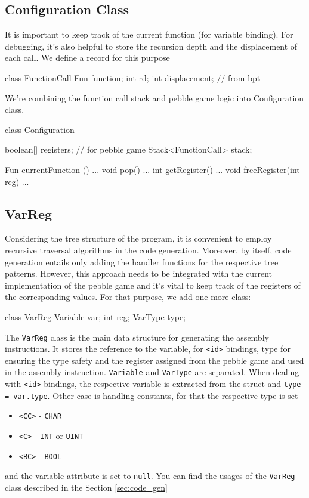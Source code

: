 \subsection{Configuration Class}
It is important to keep track of the current function (for variable binding). For debugging, it's also helpful to
store the recursion depth and the displacement of each call. We define a record for this purpose
\begin{codeblock}
class FunctionCall {
    Fun function;
    int rd;
    int displacement; // from bpt
}
\end{codeblock}
We're combining the function call stack and pebble game logic into Configuration class.
\begin{codeblock}
class Configuration {
    boolean[] registers; // for pebble game
    Stack<FunctionCall> stack;

    Fun currentFunction () { ... }
    void pop() { ... }
    int getRegister() { ... }
    void freeRegister(int reg) { ... }
}
\end{codeblock}

\subsection{VarReg}
Considering the tree structure of the program, it is convenient to employ recursive traversal algorithms in the code generation.
Moreover, by itself, code generation entails only adding the handler functions for the respective tree patterns. However, this
approach needs to be integrated with the current implementation of the pebble game and it's vital
to keep track of the registers of the corresponding values. For that purpose, we add one more class:
\begin{codeblock}
class VarReg {
    Variable var;
    int reg;
    VarType type;
}
\end{codeblock}
The \verb+VarReg+ class is the main data structure for generating the assembly instructions.
It stores the reference to the variable, for \verb+<id>+ bindings, type for ensuring the type safety and the register
assigned from the pebble game and used in the assembly instruction.
\verb+Variable+ and \verb+VarType+ are separated. When dealing with \verb+<id>+ bindings, the respective variable is
extracted from the struct and \verb+type = var.type+. Other case is handling constants, for that the respective
type is set
\begin{itemize}
\item \verb+<CC>+ - \verb+CHAR+
\item \verb+<C>+ - \verb+INT+ or \verb+UINT+
\item \verb+<BC>+ - \verb+BOOL+
\end{itemize}
and the variable attribute is set to \verb+null+. You can find the usages of the \verb+VarReg+ class
described in the Section \ref{sec:code_gen}

